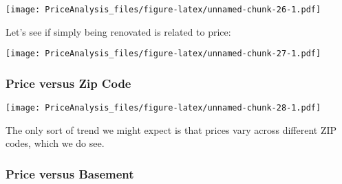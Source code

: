 \documentclass[]{article}
\newenvironment{Shaded}{\begin{snugshade}}{\end{snugshade}}
\newcommand{\KeywordTok}[1]{\textcolor[rgb]{0.13,0.29,0.53}{\textbf{#1}}}
\newcommand{\DataTypeTok}[1]{\textcolor[rgb]{0.13,0.29,0.53}{#1}}
\newcommand{\DecValTok}[1]{\textcolor[rgb]{0.00,0.00,0.81}{#1}}
\newcommand{\StringTok}[1]{\textcolor[rgb]{0.31,0.60,0.02}{#1}}
\newcommand{\OperatorTok}[1]{\textcolor[rgb]{0.81,0.36,0.00}{\textbf{#1}}}
\newcommand{\NormalTok}[1]{#1}
\begin{document}
\texttt{[image: PriceAnalysis\_files/figure-latex/unnamed-chunk-26-1.pdf]}

Let's see if simply being renovated is related to price:

\begin{Shaded}
\end{Shaded}

\texttt{[image: PriceAnalysis\_files/figure-latex/unnamed-chunk-27-1.pdf]}

\subsubsection{Price versus Zip Code}\label{price-versus-zip-code}

\begin{Shaded}
\end{Shaded}

\texttt{[image: PriceAnalysis\_files/figure-latex/unnamed-chunk-28-1.pdf]}

The only sort of trend we might expect is that prices vary across
different ZIP codes, which we do see.

\subsubsection{Price versus Basement}\label{price-versus-basement}

\begin{Shaded}
\end{Shaded}
\end{document}
